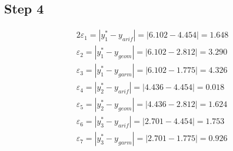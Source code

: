 \documentclass{article}%
\begin{document}
%
\subsection{Step 4}%
\label{subsec:Step4}%
\begin{alignat*}{2}%
\varepsilon_1 = |y_1^* - y_{arif}| = |6.102 - 4.454| = 1.648 \\%
\varepsilon_2 = |y_1^* - y_{geom}| = |6.102 - 2.812| = 3.290 \\%
\varepsilon_3 = |y_1^* - y_{garm}| = |6.102 - 1.775| = 4.326 \\%
\varepsilon_4 = |y_2^* - y_{arif}| = |4.436 - 4.454| = 0.018 \\%
\varepsilon_5 = |y_2^* - y_{geom}| = |4.436 - 2.812| = 1.624 \\%
\varepsilon_6 = |y_3^* - y_{arif}| = |2.701 - 4.454| = 1.753 \\%
\varepsilon_7 = |y_3^* - y_{garm}| = |2.701 - 1.775| = 0.926 \\%
\end{alignat*}

%
\end{document}
